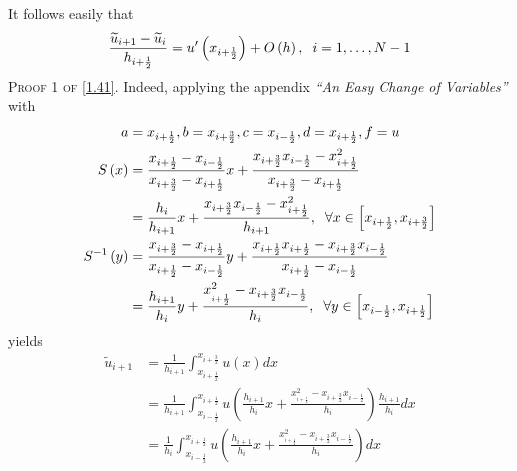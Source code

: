 \documentclass[a4paper]{article}
\numberwithin{equation}{section}
\begin{document}
It follows easily that 
\begin{align}
\label{1.41}
\frac{{{{\widetilde u}_{i + 1}} - {{\widetilde u}_i}}}{{{h_{i + \frac{1}{2}}}}} = {u'}\left( {{x_{i + \frac{1}{2}}}} \right) + O\left( h \right),\hspace{0.2cm} i = 1, \ldots ,N - 1
\end{align}
\textsc{Proof 1 of \eqref{1.41}.} Indeed, applying the appendix \textit{``An Easy Change of Variables''} with 
\begin{align}
a &= {x_{i + \frac{1}{2}}},b = {x_{i + \frac{3}{2}}},c = {x_{i - \frac{1}{2}}},d = {x_{i + \frac{1}{2}}},f = u\\
S\left( x \right) &= \frac{{{x_{i + \frac{1}{2}}} - {x_{i - \frac{1}{2}}}}}{{{x_{i + \frac{3}{2}}} - {x_{i + \frac{1}{2}}}}}x + \frac{{{x_{i + \frac{3}{2}}}{x_{i - \frac{1}{2}}} - x_{i + \frac{1}{2}}^2}}{{{x_{i + \frac{3}{2}}} - {x_{i + \frac{1}{2}}}}}\\
 &= \frac{{{h_i}}}{{{h_{i + 1}}}}x + \frac{{{x_{i + \frac{3}{2}}}{x_{i - \frac{1}{2}}} - x_{i + \frac{1}{2}}^2}}{{{h_{i + 1}}}},\hspace{0.2cm}\forall x \in \left[ {{x_{i + \frac{1}{2}}},{x_{i + \frac{3}{2}}}} \right]\\
{S^{ - 1}}\left( y \right) &= \frac{{{x_{i + \frac{3}{2}}} - {x_{i + \frac{1}{2}}}}}{{{x_{i + \frac{1}{2}}} - {x_{i - \frac{1}{2}}}}}y + \frac{{{x_{i + \frac{1}{2}}}{x_{i + \frac{1}{2}}} - {x_{i + \frac{3}{2}}}{x_{i - \frac{1}{2}}}}}{{{x_{i + \frac{1}{2}}} - {x_{i - \frac{1}{2}}}}}\\
& = \frac{{{h_{i + 1}}}}{{{h_i}}}y + \frac{{x_{_{i + \frac{1}{2}}}^2 - {x_{i + \frac{3}{2}}}{x_{i - \frac{1}{2}}}}}{{{h_i}}},\hspace{0.2cm}\forall y \in \left[ {{x_{i - \frac{1}{2}}},{x_{i + \frac{1}{2}}}} \right]
\end{align}
yields
\begin{align}
{\widetilde u_{i + 1}} &= \frac{1}{{{h_{i + 1}}}}\int_{{x_{i + \frac{1}{2}}}}^{{x_{i + \frac{3}{2}}}} {u\left( x \right)dx} \\
 &= \frac{1}{{{h_{i + 1}}}}\int_{{x_{i - \frac{1}{2}}}}^{{x_{i + \frac{1}{2}}}} {u\left( {\frac{{{h_{i + 1}}}}{{{h_i}}}x + \frac{{x_{_{i + \frac{1}{2}}}^2 - {x_{i + \frac{3}{2}}}{x_{i - \frac{1}{2}}}}}{{{h_i}}}} \right)\frac{{{h_{i + 1}}}}{{{h_i}}}dx} \\
 &= \frac{1}{{{h_i}}}\int_{{x_{i - \frac{1}{2}}}}^{{x_{i + \frac{1}{2}}}} {u\left( {\frac{{{h_{i + 1}}}}{{{h_i}}}x + \frac{{x_{_{i + \frac{1}{2}}}^2 - {x_{i + \frac{3}{2}}}{x_{i - \frac{1}{2}}}}}{{{h_i}}}} \right)dx} 
\end{align}
\end{document}
